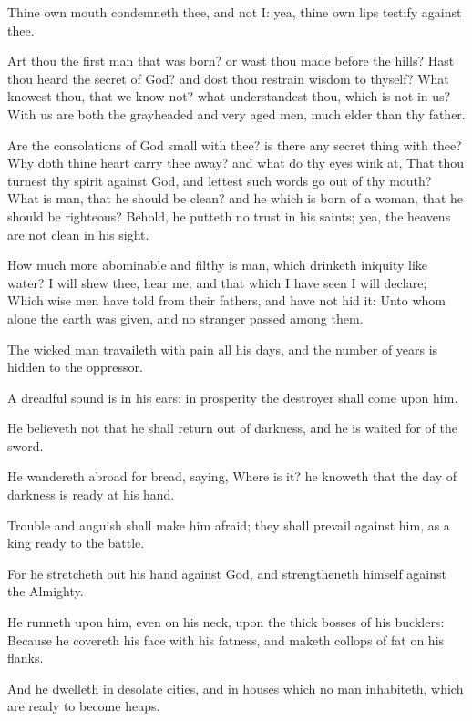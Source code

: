 \verse Thine own mouth condemneth thee, and not I: yea, thine own lips testify against thee.

\verse Art thou the first man that was born? or wast thou made before the hills?  \verse Hast thou heard the secret of God? and dost thou restrain wisdom to thyself?  \verse What knowest thou, that we know not?  what understandest thou, which is not in us?  \verse With us are both the grayheaded and very aged men, much elder than thy father.

\verse Are the consolations of God small with thee? is there any secret thing with thee?  \verse Why doth thine heart carry thee away? and what do thy eyes wink at, \verse That thou turnest thy spirit against God, and lettest such words go out of thy mouth?  \verse What is man, that he should be clean? and he which is born of a woman, that he should be righteous?  \verse Behold, he putteth no trust in his saints; yea, the heavens are not clean in his sight.

\verse How much more abominable and filthy is man, which drinketh iniquity like water?  \verse I will shew thee, hear me; and that which I have seen I will declare; \verse Which wise men have told from their fathers, and have not hid it: \verse Unto whom alone the earth was given, and no stranger passed among them.

\verse The wicked man travaileth with pain all his days, and the number of years is hidden to the oppressor.

\verse A dreadful sound is in his ears: in prosperity the destroyer shall come upon him.

\verse He believeth not that he shall return out of darkness, and he is waited for of the sword.

\verse He wandereth abroad for bread, saying, Where is it? he knoweth that the day of darkness is ready at his hand.

\verse Trouble and anguish shall make him afraid; they shall prevail against him, as a king ready to the battle.

\verse For he stretcheth out his hand against God, and strengtheneth himself against the Almighty.

\verse He runneth upon him, even on his neck, upon the thick bosses of his bucklers: \verse Because he covereth his face with his fatness, and maketh collops of fat on his flanks.

\verse And he dwelleth in desolate cities, and in houses which no man inhabiteth, which are ready to become heaps.

